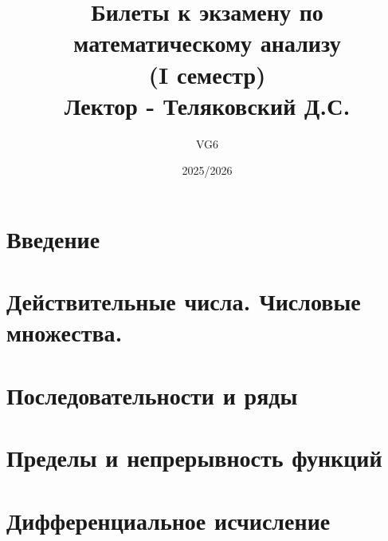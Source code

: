 \documentclass[12pt, a4paper]{article}
\title{Билеты к экзамену по математическому анализу\\(I семестр) \\Лектор - Теляковский Д.С.}
\author{VG6}
\date{2025/2026}
\begin{document}
\maketitle
\tableofcontents
\newpage


\section{Введение}



\section{Действительные числа. Числовые множества.}


\section{Последовательности и ряды}

















\section{Пределы и непрерывность функций}























\section{Дифференциальное исчисление}












\end{document}
